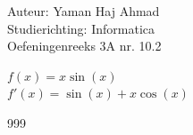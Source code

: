 \documentclass[a4paper]{article}
\begin{document}
\noindent \large Auteur: Yaman Haj Ahmad \\
\noindent \large Studierichting: Informatica\\
\noindent \large Oefeningenreeks 3A nr. 10.2\\

\medskip

\normalsize

$f(x) = x\sin\left(x\right)$\\

$f'(x) = \sin\left(x\right) + x\cos\left(x\right)$


\begin{thebibliography}{999}
\end{thebibliography}
\end{document}
